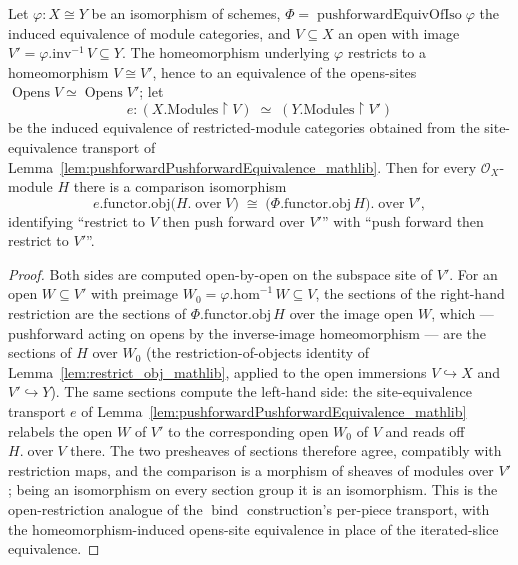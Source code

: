 \begin{lemma}
  \label{lem:pushforward_commutes_restriction}
  Let \(\varphi : X \cong Y\) be an isomorphism of schemes,
  \(\Phi = \operatorname{pushforwardEquivOfIso}\varphi\) the induced equivalence of module categories,
  and \(V \subseteq X\) an open with image \(V' = \varphi.\mathrm{inv}^{-1}\,V \subseteq Y\). The
  homeomorphism underlying \(\varphi\) restricts to a homeomorphism \(V \cong V'\), hence to an
  equivalence of the opens-sites \(\operatorname{Opens} V \simeq \operatorname{Opens} V'\); let
  \[
    e : (X.\mathrm{Modules} \!\restriction\! V) \;\simeq\; (Y.\mathrm{Modules} \!\restriction\! V')
  \]
  be the induced equivalence of restricted-module categories obtained from the site-equivalence
  transport of Lemma~\ref{lem:pushforwardPushforwardEquivalence_mathlib}. Then for every
  \(\mathcal{O}_X\)-module \(H\) there is a comparison isomorphism
  \[
    e.\mathrm{functor}.\mathrm{obj}\bigl(H.\operatorname{over} V\bigr)
      \;\cong\;
    \bigl(\Phi.\mathrm{functor}.\mathrm{obj}\, H\bigr).\operatorname{over} V',
  \]
  identifying ``restrict to \(V\) then push forward over \(V'\)'' with ``push forward then restrict to
  \(V'\)''.
\end{lemma}
\begin{proof}
  Both sides are computed open-by-open on the subspace site of \(V'\). For an open
  \(W \subseteq V'\) with preimage \(W_0 = \varphi.\mathrm{hom}^{-1}\,W \subseteq V\), the sections of the
  right-hand restriction are the sections of \(\Phi.\mathrm{functor}.\mathrm{obj}\, H\) over the image
  open \(W\), which — pushforward acting on opens by the inverse-image homeomorphism — are the sections
  of \(H\) over \(W_0\) (the restriction-of-objects identity of Lemma~\ref{lem:restrict_obj_mathlib},
  applied to the open immersions \(V \hookrightarrow X\) and \(V' \hookrightarrow Y\)). The same
  sections compute the left-hand side: the site-equivalence transport
  \(e\) of Lemma~\ref{lem:pushforwardPushforwardEquivalence_mathlib} relabels the open \(W\) of \(V'\)
  to the corresponding open \(W_0\) of \(V\) and reads off \(H.\operatorname{over} V\) there. The two
  presheaves of sections therefore agree, compatibly with restriction maps, and the comparison is a
  morphism of sheaves of modules over \(V'\); being an isomorphism on every section group it is an
  isomorphism. This is the open-restriction analogue of the \(\operatorname{bind}\) construction's
  per-piece transport, with the homeomorphism-induced opens-site equivalence in place of the
  iterated-slice equivalence.
\end{proof}

